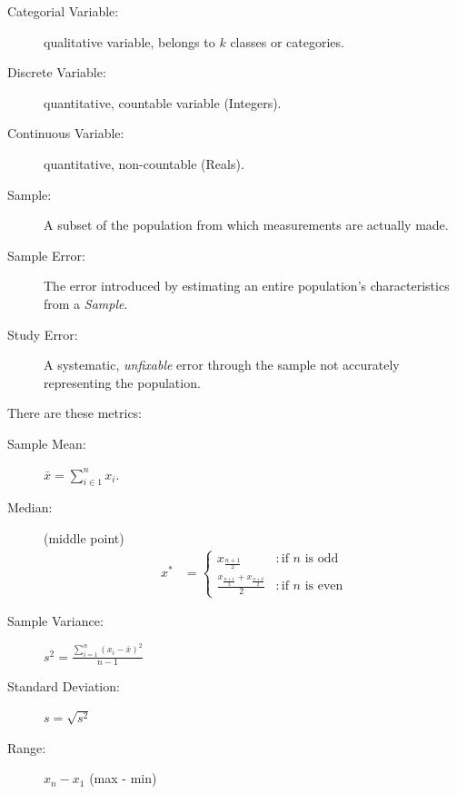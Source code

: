                 \begin{description}
                    \item[Categorial Variable:] qualitative variable, belongs to $k$ classes or categories.
                    \item[Discrete Variable:] quantitative, countable variable (Integers).
                    \item[Continuous Variable:] quantitative, non-countable (Reals).
                    \item[Sample:] A subset of the population from which measurements are actually made.
                    \item[Sample Error:] The error introduced by estimating an entire population's characteristics from a \emph{Sample}.
                    \item[Study Error:] A systematic, \emph{unfixable} error through the sample not accurately representing the population.
                \end{description}

                There are these metrics:
                \begin{description}
                    \item[Sample Mean:] $\bar{x} = \sum_{i \in 1}^{n} x_i$.
                    \item[Median:] (middle point)
                        \begin{align*}
                        x^* &= \left\{
                             \begin{array}{lr}
                               x_{\frac{n+1}{2}} & : \text{if $n$ is odd} \\
                               \frac{x_{\frac{n+1}{2}} + x_{\frac{n+2}{2}}}{2} & : \text{if $n$ is even}
                             \end{array}
                           \right.
                    \end{align*}
                    \item[Sample Variance:] $s^2 = \frac{\sum_{i=1}^n (x_i - \bar{x})^2}{n-1}$
                    \item[Standard Deviation:] $s = \sqrt{s^2}$
                    \item[Range:] $x_n - x_1$ (max - min)
                \end{description}

